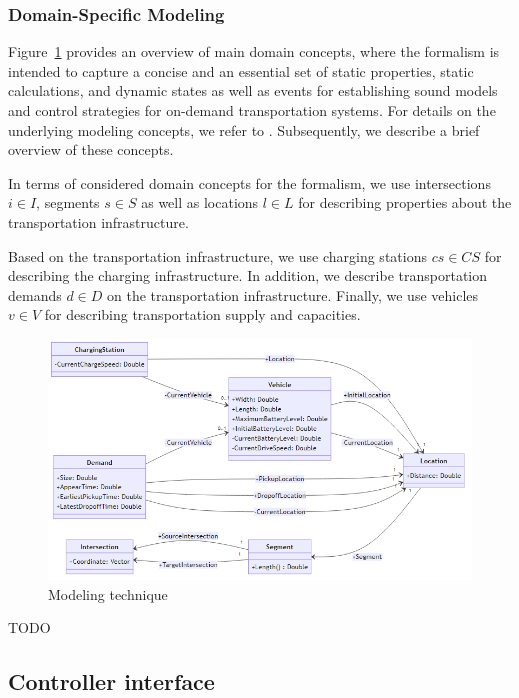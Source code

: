 \documentclass[10pt,twocolumn]{article}
\begin{document}
\subsubsection{Domain-Specific Modeling}
\label{sec:domain-specific-modeling}

Figure~\ref{fig:modeling-technique} provides an overview of main domain concepts, where the formalism is intended to capture a concise and an essential set of static properties, static calculations, and dynamic states as well as events for establishing sound models and control strategies for on-demand transportation systems. For details on the underlying modeling concepts, we refer to \cite{ascher2023discrete}. Subsequently, we describe a brief overview of these concepts.

In terms of considered domain concepts for the formalism, we use intersections $i \in I$, segments $s \in S$ as well as locations $l \in L$ for describing properties about the transportation infrastructure.

Based on the transportation infrastructure, we use charging stations $cs \in CS$ for describing the charging infrastructure. In addition, we describe transportation demands $d \in D$ on the transportation infrastructure. 
Finally, we use vehicles $v \in V$ for describing transportation supply and capacities.

\begin{figure}[tbp]
    \includegraphics[width=\textwidth]{../../diagrams/model/classes-v0.1.png}
    \caption{Modeling technique}
    \label{fig:modeling-technique}
\end{figure}

TODO

\subsection{Controller interface}
\label{sec:controller-interface}
\end{document}
